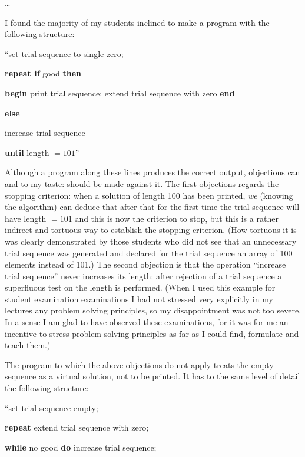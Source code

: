 \dots

I found the majority of my students inclined to make a program with the following structure:

\hspace{-.4em}``set trial sequence to single zero;

\textbf{repeat if} good \textbf{then}

\quad \textbf{begin} print trial sequence; extend trial sequence with zero \textbf{end}

\quad\quad\quad \textbf{else}

\quad increase trial sequence

\textbf{until} length $= 101$''

Although a program along these lines produces the correct output, objections can \textemdash{}  and to my taste: should \textemdash{}  be made against it. The first objections regards the stopping criterion: when a solution of length 100 has been printed, \textit{we} (knowing the algorithm) can deduce that after that for the first time the trial sequence will have length $= 101$ and this is now the criterion to stop, but this is a rather indirect and tortuous way to establish the stopping criterion. (How tortuous it is was clearly demonstrated by those students who did not see that an unnecessary trial sequence was generated and declared for the trial sequence an array of 100 elements instead of 101.) The second objection is that the operation ``increase trial sequence'' never increases its length: after rejection of a trial sequence a superfluous test on the length is performed. (When I used this example for student examination examinations I had not stressed very explicitly in my lectures any problem solving principles, so my disappointment was not too severe. In a sense I am glad to have observed these examinations, for it was for me an incentive to stress problem solving principles as far as I could find, formulate and teach them.)

The program to which the above objections do not apply treats the empty sequence as a virtual solution, not to be printed. It has \textemdash{}  to the same level of detail \textemdash{}  the following structure:

\quad \hspace{-.4em}``set trial sequence empty;

\quad \textbf{repeat} extend trial sequence with zero;

\quad \quad \textbf{while} no good \textbf{do} increase trial sequence;

